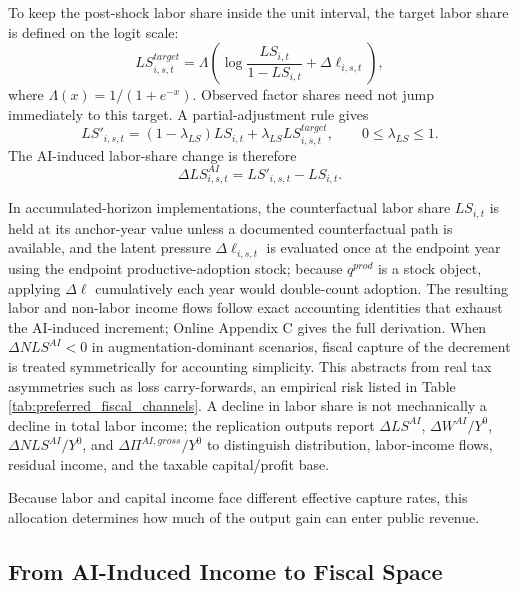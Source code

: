 \documentclass[11pt,a4paper]{article}
\begin{document}
To keep the post-shock labor share inside the unit interval, the target labor share is defined on the logit scale:
\begin{equation}
    LS^{target}_{i,s,t}
    =
    \Lambda\left(
    \log\frac{LS_{i,t}}{1-LS_{i,t}}+
    \Delta \ell_{i,s,t}
    \right),
\end{equation}
where $\Lambda(x)=1/(1+e^{-x})$. Observed factor shares need not jump immediately to this target. A partial-adjustment rule gives
\begin{equation}
    LS'_{i,s,t}
    =
    (1-\lambda_{LS})LS_{i,t}
    +
    \lambda_{LS}LS^{target}_{i,s,t},
    \qquad 0\leq\lambda_{LS}\leq1.
\end{equation}
The AI-induced labor-share change is therefore
\begin{equation}
    \Delta LS^{AI}_{i,s,t}=LS'_{i,s,t}-LS_{i,t}.
\end{equation}

In accumulated-horizon implementations, the counterfactual labor share $LS_{i,t}$ is held at its anchor-year value unless a documented counterfactual path is available, and the latent pressure $\Delta\ell_{i,s,t}$ is evaluated once at the endpoint year using the endpoint productive-adoption stock; because $q^{prod}$ is a stock object, applying $\Delta\ell$ cumulatively each year would double-count adoption.
The resulting labor and non-labor income flows follow exact accounting identities that exhaust the AI-induced increment; Online Appendix C gives the full derivation. When $\Delta NLS^{AI}<0$ in augmentation-dominant scenarios, fiscal capture of the decrement is treated symmetrically for accounting simplicity. This abstracts from real tax asymmetries such as loss carry-forwards, an empirical risk listed in Table \ref{tab:preferred_fiscal_channels}. A decline in labor share is not mechanically a decline in total labor income; the replication outputs report $\Delta LS^{AI}$, $\Delta W^{AI}/Y^0$, $\Delta NLS^{AI}/Y^0$, and $\Delta\Pi^{AI,gross}/Y^0$ to distinguish distribution, labor-income flows, residual income, and the taxable capital/profit base.

Because labor and capital income face different effective capture rates, this allocation determines how much of the output gain can enter public revenue.




\subsection{From AI-Induced Income to Fiscal Space}\label{sec:fiscal_conversion}
\end{document}
